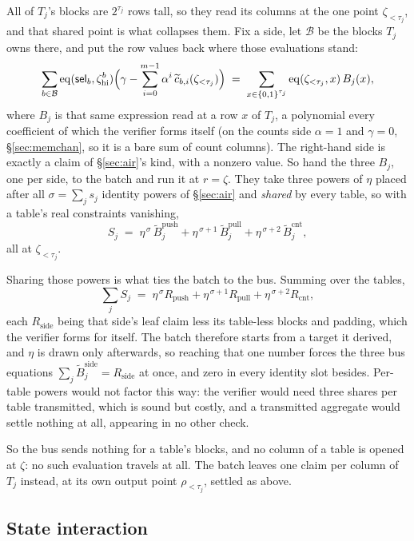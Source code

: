 \documentclass[11pt]{article}
\newcommand{\eq}{\operatorname{eq}}
\newcommand{\cube}[1]{\{0,1\}^{#1}}
\begin{document}
All of $T_j$'s blocks are $2^{\tau_j}$ rows tall, so they read its columns at the one point $\zeta_{<\tau_j}$, and that shared point is what collapses them. Fix a side, let $\mathcal B$ be the blocks $T_j$ owns there, and put the row values back where those evaluations stand:
\[
  \sum_{b\in\mathcal B}\eq(\mathsf{sel}_b,\zeta^{b}_{\mathrm{hi}})\Bigl(\gamma-\sum_{i=0}^{m-1}\alpha^{i}\,\widetilde c_{b,i}(\zeta_{<\tau_j})\Bigr)
  \;=\;\sum_{x\in\cube{\tau_j}}\eq(\zeta_{<\tau_j},x)\,B_j(x),
\]
where $B_j$ is that same expression read at a row $x$ of $T_j$, a polynomial every coefficient of which the verifier forms itself (on the counts side $\alpha=1$ and $\gamma=0$, \S\ref{sec:memchan}, so it is a bare sum of count columns). The right-hand side is exactly a claim of \S\ref{sec:air}'s kind, with a nonzero value. So hand the three $B_j$, one per side, to the batch and run it at $r=\zeta$. They take three powers of $\eta$ placed after all $\sigma=\sum_j s_j$ identity powers of \S\ref{sec:air} and \emph{shared} by every table, so with a table's real constraints vanishing,
\[
  S_j\;=\;\eta^{\,\sigma}\,\widetilde B^{\mathrm{push}}_j+\eta^{\,\sigma+1}\,\widetilde B^{\mathrm{pull}}_j+\eta^{\,\sigma+2}\,\widetilde B^{\mathrm{cnt}}_j ,
\]
all at $\zeta_{<\tau_j}$.

Sharing those powers is what ties the batch to the bus. Summing over the tables,
\[
  \sum_j S_j\;=\;\eta^{\,\sigma}R_{\mathrm{push}}+\eta^{\,\sigma+1}R_{\mathrm{pull}}+\eta^{\,\sigma+2}R_{\mathrm{cnt}} ,
\]
each $R_{\mathrm{side}}$ being that side's leaf claim less its table-less blocks and padding, which the verifier forms for itself. The batch therefore starts from a target it derived, and $\eta$ is drawn only afterwards, so reaching that one number forces the three bus equations $\sum_j\widetilde B^{\mathrm{side}}_j=R_{\mathrm{side}}$ at once, and zero in every identity slot besides. Per-table powers would not factor this way: the verifier would need three shares per table transmitted, which is sound but costly, and a transmitted aggregate would settle nothing at all, appearing in no other check.

So the bus sends nothing for a table's blocks, and no column of a table is opened at $\zeta$: no such evaluation travels at all. The batch leaves one claim per column of $T_j$ instead, at its own output point $\rho_{<\tau_j}$, settled as above.

\subsection{State interaction}\label{sec:state}
\end{document}
